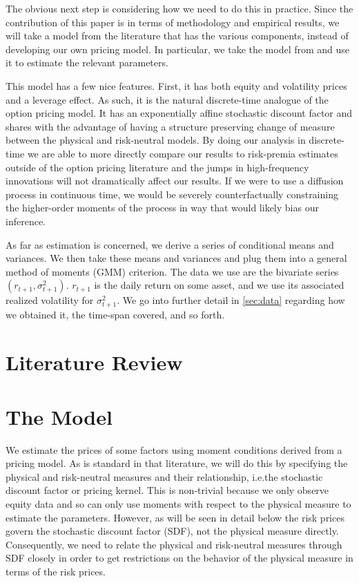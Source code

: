 \documentclass[11pt, letterpaper, twoside, final]{article}
\begin{document}
The obvious next step is considering how we need to do this in practice. Since the contribution of this paper is in terms of methodology and empirical results, we will take a model from the literature that has the various components, instead of developing our own pricing model. In particular, we take the model from \textcite{khrapov2016affine} and use it to estimate the relevant parameters. 

This model has a few nice features.  First, it has both equity and volatility prices and a leverage effect.  As such, it is the natural discrete-time analogue of the \textcite{heston1993closedform} option pricing model.  It has an exponentially affine stochastic discount factor and shares with \textcite{heston1993closedform} the advantage of having a structure preserving change of measure between the physical and risk-neutral models. By doing our analysis in discrete-time we are able to more directly compare our results to risk-premia estimates outside of the option pricing literature and the jumps in high-frequency innovations will not dramatically affect our results.  If we were to use a diffusion process in continuous time, we would be severely counterfactually constraining the higher-order moments of the process in way that would likely bias our inference. 

As far as estimation is concerned, we derive a series of conditional means and variances. We then take these means and variances and plug them into a general method of moments (GMM) criterion. The data we use are the bivariate series $(r_{t+1}, \sigma^2_{t+1})$. $r_{t+1}$ is the daily return on some asset, and we use its associated realized volatility for $\sigma^2_{t+1}$. We go into further detail in \cref{sec:data} regarding how we obtained it, the time-span covered, and so forth.

\section{Literature Review}\label{sec:lit_review}


\section{The Model}\label{sec:model}

\addtocounter{subsection}{1}

We estimate the prices of some factors using moment conditions derived from a pricing model.  As is standard in that literature, we will do this by specifying the physical and risk-neutral measures and their relationship, i.e.\@ the stochastic discount factor or pricing kernel. This is non-trivial because we only observe equity data and so can only use moments with respect to the physical measure to estimate the parameters.  However, as will be seen in detail below the risk prices govern the stochastic discount factor (SDF), not the physical measure directly.  Consequently, we need to relate the physical and risk-neutral measures through SDF closely in order to get restrictions on the behavior of the physical measure in terms of the risk prices. 
\end{document}
